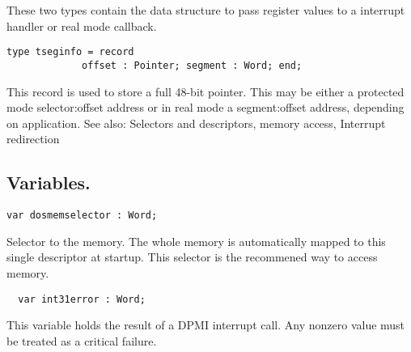 These two types contain the data structure to pass register values to a
interrupt handler or real mode callback.
\begin{verbatim}
type tseginfo = record
             offset : Pointer; segment : Word; end;
\end{verbatim}
This record is used to store a full 48-bit pointer. This may be either a
protected mode selector:offset address or in real mode a segment:offset
address, depending on application.
See also: Selectors and descriptors, \dos memory access, Interrupt
redirection
\subsection{Variables.}
\begin{verbatim}
var dosmemselector : Word;
\end{verbatim}
Selector to the \dos memory. The whole \dos memory is automatically mapped to
this single descriptor at startup. This selector is the recommened way to
access \dos memory.
\begin{verbatim}
  var int31error : Word;
\end{verbatim}
This variable holds the result of a DPMI interrupt call. Any nonzero value
must be treated as a critical failure.
